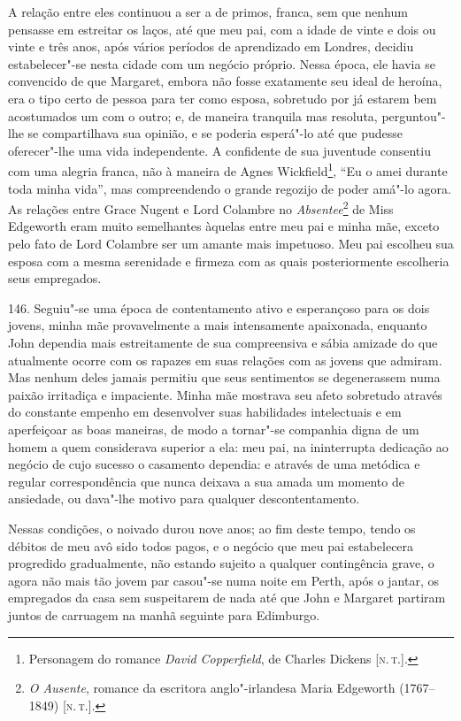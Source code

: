 A relação entre eles continuou a ser a de primos, franca, sem que nenhum
pensasse em estreitar os laços, até que meu pai, com a idade de vinte e
dois ou vinte e três anos, após vários períodos de aprendizado em
Londres, decidiu estabelecer"-se nesta cidade com um negócio próprio.
Nessa época, ele havia se convencido de que Margaret, embora não fosse
exatamente seu ideal de heroína, era o tipo certo de pessoa para ter
como esposa, sobretudo por já estarem bem acostumados um com o outro; e,
de maneira tranquila mas resoluta, perguntou"-lhe se compartilhava sua
opinião, e se poderia esperá"-lo até que pudesse oferecer"-lhe uma vida
independente. A confidente de sua juventude consentiu com uma alegria
franca, não à maneira de Agnes Wickfield\footnote{Personagem do romance
  \emph{David Copperfield}, de Charles Dickens {[}\textsc{n.\,t.}{]}.}, ``Eu o
amei durante toda minha vida'', mas compreendendo o grande regozijo de
poder amá"-lo agora. As relações entre Grace Nugent e Lord Colambre no
\emph{Absentee}\footnote{\emph{O Ausente}, romance da escritora
  anglo"-irlandesa Maria Edgeworth (1767--1849) {[}\textsc{n.\,t.}{]}.} de Miss
Edgeworth eram muito semelhantes àquelas entre meu pai e minha mãe,
exceto pelo fato de Lord Colambre ser um amante mais impetuoso. Meu pai
escolheu sua esposa com a mesma serenidade e firmeza com as quais
posteriormente escolheria seus empregados.

146. Seguiu"-se uma época de contentamento ativo e esperançoso para os
dois jovens, minha mãe provavelmente a mais intensamente apaixonada,
enquanto John dependia mais estreitamente de sua compreensiva e sábia
amizade do que atualmente ocorre com os rapazes em suas relações com as
jovens que admiram. Mas nenhum deles jamais permitiu que seus
sentimentos se degenerassem numa paixão irritadiça e impaciente. Minha
mãe mostrava seu afeto sobretudo através do constante empenho em
desenvolver suas habilidades intelectuais e em aperfeiçoar as boas
maneiras, de modo a tornar"-se companhia digna de um homem a quem
considerava superior a ela: meu pai, na ininterrupta dedicação ao
negócio de cujo sucesso o casamento dependia: e através de uma metódica
e regular correspondência que nunca deixava a sua amada um momento de
ansiedade, ou dava"-lhe motivo para qualquer descontentamento.

Nessas condições, o noivado durou nove anos; ao fim deste tempo, tendo
os débitos de meu avô sido todos pagos, e o negócio que meu pai
estabelecera progredido gradualmente, não estando sujeito a qualquer
contingência grave, o agora não mais tão jovem par casou"-se numa noite
em Perth, após o jantar, os empregados da casa sem suspeitarem de nada
até que John e Margaret partiram juntos de carruagem na manhã seguinte
para Edimburgo.

